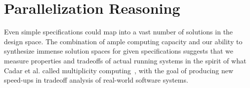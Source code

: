 \documentclass[10pt,conference]{IEEEtran}
\begin{document}
 


\section{Parallelization Reasoning} %
\label{parallelization}

Even simple specifications could map into a vast number of solutions in the design space. The combination of ample computing capacity and our ability to synthesize immense solution spaces for given specifications suggests that we measure properties and tradeoffs of actual running systems in the spirit of what Cadar et al. called multiplicity computing~\cite{cadar_multiplicity_2010}, with the goal of producing new speed-ups in tradeoff analysis of real-world software systems.


\end{document}
